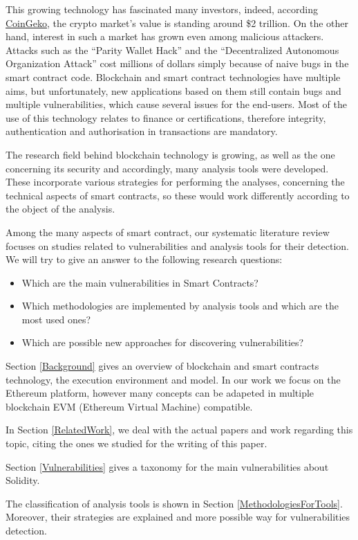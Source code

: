 \documentclass[a4paper,sigconf, language=french,
language=german, language=spanish, language=english]{acmart}
\begin{document}
This growing technology has fascinated many investors, indeed, according \href{https://www.coingecko.com/}{CoinGeko}, 
the crypto market's value is standing around \$2 trillion. 
On the other hand, interest in such a market has grown even among malicious attackers. 
Attacks such as the “Parity Wallet Hack” and the “Decentralized Autonomous Organization Attack” cost millions of dollars simply because of 
naive bugs in the smart contract code. Blockchain and smart contract technologies have multiple aims, but unfortunately, new applications 
based on them still contain bugs and multiple vulnerabilities, which cause 
several issues for the end-users. Most of the use of this technology relates to finance or certifications, therefore integrity, 
authentication and authorisation in transactions are mandatory. 

The research field behind blockchain technology is growing, as well as the one concerning 
its security and accordingly, many analysis tools were developed. 
These incorporate various strategies for performing the analyses, concerning the technical aspects of smart contracts, 
so these would work differently according to the object of the analysis. 

Among the many aspects of smart contract, our systematic
literature review focuses on studies related to vulnerabilities and 
analysis tools for their detection. We will try to give an answer to the following 
research questions:
\begin{itemize}
    \item Which are the main vulnerabilities in Smart Contracts?
    \item Which methodologies are implemented by analysis tools and which are the most used ones?
    \item Which are possible new approaches for discovering vulnerabilities?
\end{itemize}
Section \ref{Background} gives an overview of blockchain and smart contracts technology, the execution environment and model. 
In our work we focus on the Ethereum platform, however many concepts can be adapeted in multiple blockchain EVM (Ethereum Virtual Machine) compatible.

In Section \ref{RelatedWork}, we deal with the actual papers and work regarding this topic, citing the ones we studied for the writing of this paper.

Section \ref{Vulnerabilities} gives a taxonomy for the main vulnerabilities about Solidity. 

The classification of analysis tools is shown in Section \ref{MethodologiesForTools}. Moreover, their strategies are explained and more possible way for vulnerabilities detection.
\end{document}
